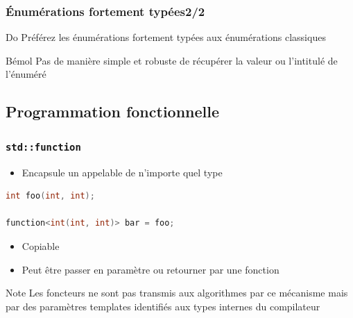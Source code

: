 \documentclass[C++.tex]{subfiles}
\begin{document}
\begin{frame}[fragile]
	\frametitle{Énumérations fortement typées\titlehfill{}2/2}
	\begin{exampleblock}{Do}
		Préférez les énumérations fortement typées aux énumérations classiques
	\end{exampleblock}

	\begin{block}{Bémol}
		Pas de manière simple et robuste de récupérer la valeur ou l'intitulé de l'énuméré

	\end{block}
\end{frame}

\subsection*{Programmation fonctionnelle}
\begin{frame}[fragile]
	\frametitle{\lstinline|std::function|}

	\begin{itemize}
		\item Encapsule un appelable de n'importe quel type
	\end{itemize}

	\begin{lstlisting}[language=C++]
int foo(int, int);

function<int(int, int)> bar = foo;\end{lstlisting}

	\begin{itemize}
		\item Copiable
		\item Peut être passer en paramètre ou retourner par une fonction
	\end{itemize}

	\begin{block}{Note}
		Les foncteurs ne sont pas transmis aux algorithmes par ce mécanisme mais par des paramètres templates identifiés aux types internes du compilateur
	
	\end{block}
\end{frame}
\end{document}
